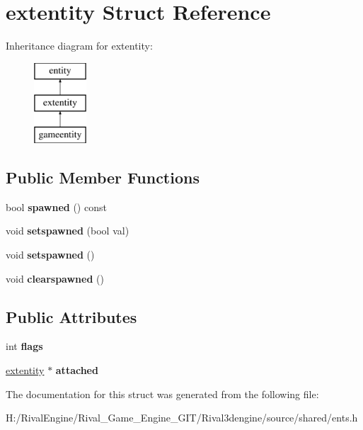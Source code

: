 \hypertarget{structextentity}{}\section{extentity Struct Reference}
\label{structextentity}
Inheritance diagram for extentity\+:\begin{figure}[H]
\begin{center}
\leavevmode
\includegraphics[height=3.000000cm]{structextentity}
\end{center}
\end{figure}
\subsection*{Public Member Functions}
\begin{DoxyCompactItemize}
\item 
\mbox{\label{structextentity_a7e4a1c4198c82649ce166fa6045bf459}} 
bool {\bfseries spawned} () const
\item 
\mbox{\label{structextentity_aa48299a46ca4dad1e7061dfd67d2a967}} 
void {\bfseries setspawned} (bool val)
\item 
\mbox{\label{structextentity_ab0fe8f61de631195dd3c1134a332359a}} 
void {\bfseries setspawned} ()
\item 
\mbox{\label{structextentity_ae4758bde8de9292792a298f2fea11963}} 
void {\bfseries clearspawned} ()
\end{DoxyCompactItemize}
\subsection*{Public Attributes}
\begin{DoxyCompactItemize}
\item 
\mbox{\label{structextentity_a7a6c7b585d672811eae4870b730d8cf2}} 
int {\bfseries flags}
\item 
\mbox{\label{structextentity_aa0fd6e32aba51def1b455b69a4bc9be4}} 
\hyperlink{structextentity}{extentity} $\ast$ {\bfseries attached}
\end{DoxyCompactItemize}


The documentation for this struct was generated from the following file\+:\begin{DoxyCompactItemize}
\item 
H\+:/\+Rival\+Engine/\+Rival\+\_\+\+Game\+\_\+\+Engine\+\_\+\+G\+I\+T/\+Rival3dengine/source/shared/ents.\+h\end{DoxyCompactItemize}
